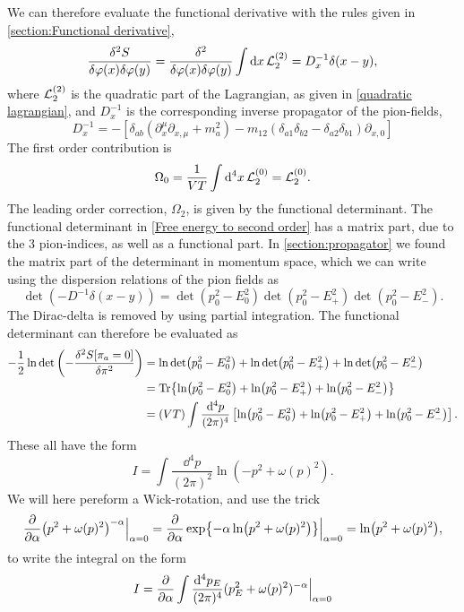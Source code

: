 We can therefore evaluate the functional derivative with the rules given in \autoref{section:Functional derivative},
\begin{align}
    \frac{\delta^2 S }{\delta \varphi(x)\delta \varphi(y)}
    = \frac{\delta^2 }{\delta \varphi(x)\delta \varphi(y)} 
    \int \dd x \, \mathcal{L}^{(2)}_2
    = D^{-1}_x \delta(x - y),
\end{align}
where $\mathcal{L}^{(2)}_2$ is the quadratic part of the Lagrangian, as given in \autoref{quadratic lagrangian}, and $D^{-1}_x$ is the corresponding inverse propagator of the pion-fields,
\begin{equation}
    D_x^{-1} = 
    - \left[
        \delta_{ab}(\partial_x^\mu\partial_{x,\mu} + m^2_a)
        -  m_{12}(\delta_{a1} \delta_{b2} - \delta_{a2}\delta_{b1}) \partial_{x, 0}
    \right] 
\end{equation}
The first order contribution is
\begin{equation}
    \Omega_0 = \frac{1}{VT}\int \dd^4 x \, \mathcal{L}_2^{(0)} = \mathcal{L}_2^{(0)}.
\end{equation}
The leading order correction, $\Omega_2$, is given by the functional determinant.
The functional determinant in \autoref{Free energy to second order} has a matrix part, due to the 3 pion-indices, as well as a functional part.
In \autoref{section:propagator} we found the matrix part of  the determinant in momentum space, which we can write using the dispersion relations of the pion fields as
\begin{equation}
    \det(- D^{-1} \delta (x - y)) = \det(p_0^2 - E_0^2) \det(p_0^2 - E_+^2) \det(p_0^2 - E_-^2).
\end{equation}
The Dirac-delta is removed by using partial integration.
The functional determinant can therefore be evaluated as
\begin{align}
    -\frac{1}{2} \ln{\det\left( - \frac{\delta^2 S[\pi_a=0]}{\delta \pi^2} \right)}
    & = \ln \det(p_0^2 - E_0^2) + \ln \det(p_0^2 - E_+^2) + \ln \det(p_0^2 - E_-^2) \\
    & = \Tr{ \ln(p_0^2 - E_0^2) + \ln(p_0^2 - E_+^2)+  \ln(p_0^2 - E_-^2) } \\
    & = (VT) \int \frac{\dd^4 p}{(2 \pi)^4} 
    \left[ \ln(p_0^2 - E_0^2) + \ln(p_0^2 - E_+^2) + \ln(p_0^2 - E_-^2)  \right].
\end{align}
These all have the form
\begin{equation}
    I = \int \frac{\dd^4 p}{(2 \pi)^2} \ln(-p^2 + \omega(p)^2).
\end{equation}
We will here pereform a Wick-rotation, and use the trick
\begin{equation}
    \pdv{\alpha} (p^2 + \omega(p)^2)^{-\alpha} \Big|_{\alpha=0}
    = \pdv{\alpha} \exp{-\alpha \ln(p^2 + \omega(p)^2) } \Big|_{\alpha=0}
    = \ln(p^2 + \omega(p)^2),
\end{equation}
to write the integral on the form
\begin{equation}
    I = \pdv{\alpha} \int \frac{\dd^4 p_E}{(2 \pi)^4} (p_E^2 + \omega(p)^2)^{-\alpha} \Big|_{\alpha=0}
\end{equation}

